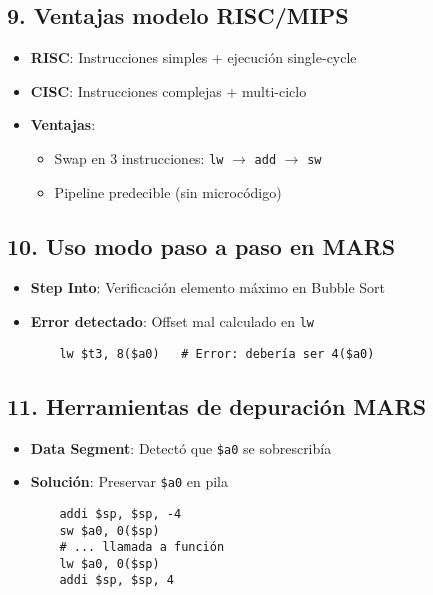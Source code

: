 \documentclass{article}
\begin{document}
\subsection*{9. Ventajas modelo RISC/MIPS}
\begin{itemize}
  \item \textbf{RISC}: Instrucciones simples + ejecución single-cycle
  \item \textbf{CISC}: Instrucciones complejas + multi-ciclo
  \item \textbf{Ventajas}:
  \begin{itemize}
    \item Swap en 3 instrucciones: \texttt{lw} $\rightarrow$ \texttt{add} $\rightarrow$ \texttt{sw}
    \item Pipeline predecible (sin microcódigo)
  \end{itemize}
\end{itemize}

\subsection*{10. Uso modo paso a paso en MARS}
\begin{itemize}
  \item \textbf{Step Into}: Verificación elemento máximo en Bubble Sort
  \item \textbf{Error detectado}: Offset mal calculado en \texttt{lw}
  \begin{verbatim}
    lw $t3, 8($a0)   # Error: debería ser 4($a0)
  \end{verbatim}
\end{itemize}

\subsection*{11. Herramientas de depuración MARS}
\begin{itemize}
  \item \textbf{Data Segment}: Detectó que \texttt{\$a0} se sobrescribía
  \item \textbf{Solución}: Preservar \texttt{\$a0} en pila
  \begin{verbatim}
    addi $sp, $sp, -4
    sw $a0, 0($sp)
    # ... llamada a función
    lw $a0, 0($sp)
    addi $sp, $sp, 4
  \end{verbatim}
\end{itemize}
\end{document}
